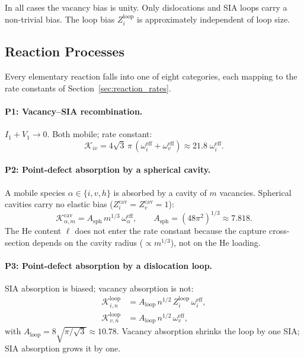 In all cases the vacancy bias is unity.  Only dislocations and SIA loops
carry a non-trivial bias.  The loop bias $Z_i^{\mathrm{loop}}$ is
approximately independent of loop size.


\subsection{Reaction Processes}
\label{sec:reaction_class}

Every elementary reaction falls into one of eight categories, each mapping
to the rate constants of Section~\ref{sec:reaction_rates}.

\paragraph{P1: Vacancy--SIA recombination.}
$I_1 + V_1 \to 0$. Both mobile; rate constant:
\begin{equation}\label{eq:P1}
    \mathcal{K}_{iv}
    = 4\sqrt{3}\,\pi\,
      (\omega_i^{\mathrm{eff}}+\omega_v^{\mathrm{eff}})
    \approx 21.8\;\omega_i^{\mathrm{eff}}.
\end{equation}

\paragraph{P2: Point-defect absorption by a spherical cavity.}
A mobile species $\alpha \in \{i,v,h\}$ is absorbed by a cavity of $m$
vacancies. Spherical cavities carry no elastic bias
($Z_i^{\mathrm{cav}} = Z_v^{\mathrm{cav}} = 1$):
\begin{equation}\label{eq:P2}
    \mathcal{K}_{\alpha,m}^{\mathrm{cav}}
    = A_{\mathrm{sph}}\,m^{1/3}\,\omega_\alpha^{\mathrm{eff}},
    \qquad A_{\mathrm{sph}} = (48\pi^2)^{1/3} \approx 7.818.
\end{equation}
The He content $\ell$ does not enter the rate constant because the capture
cross-section depends on the cavity radius ($\propto m^{1/3}$), not on the
He loading.

\paragraph{P3: Point-defect absorption by a dislocation loop.}
SIA absorption is biased; vacancy absorption is not:
\begin{align}
    \mathcal{K}_{i,n}^{\mathrm{loop}}
    &= A_{\mathrm{loop}}\,n^{1/2}\,Z_i^{\mathrm{loop}}\,
       \omega_i^{\mathrm{eff}},
    \label{eq:P3_i}\\[2pt]
    \mathcal{K}_{v,n}^{\mathrm{loop}}
    &= A_{\mathrm{loop}}\,n^{1/2}\,
       \omega_v^{\mathrm{eff}},
    \label{eq:P3_v}
\end{align}
with $A_{\mathrm{loop}} = 8\sqrt{\pi/\sqrt{3}} \approx 10.78$.
Vacancy absorption shrinks the loop by one SIA; SIA absorption grows it
by one.

